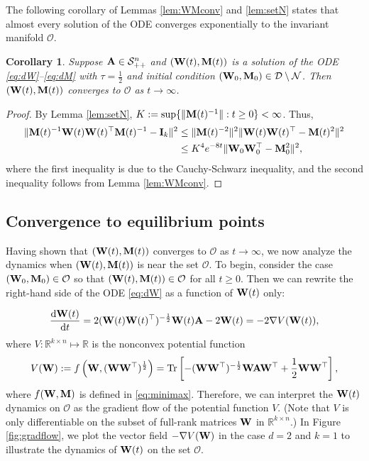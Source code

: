 \documentclass[11pt]{article}
\newtheorem{corollary}{Corollary}
\theoremstyle{definition}
\DeclareMathOperator{\tr}{Tr}
\newcommand{\dd}{\operatorname{d}\!}
\newcommand{\A}{{\bf A}}
\newcommand{\I}{{\bf I}}
\newcommand{\M}{{\bf M}}
\newcommand{\R}{\mathbb{R}}
\newcommand{\W}{{\bf W}}
\newcommand{\calD}{\mathcal{D}}
\newcommand{\calN}{\mathcal{N}}
\newcommand{\calO}{\mathcal{O}}
\newcommand{\calS}{\mathcal{S}}
\begin{document}
The following corollary of Lemmas \ref{lem:WMconv} and \ref{lem:setN} states that almost every solution of the ODE converges exponentially to the invariant manifold $\calO$.

\begin{corollary}\label{cor:MWinv}
    Suppose $\A\in\calS_{++}^n$ and $(\W(t),\M(t))$ is a solution of the ODE \eqref{eq:dW}--\eqref{eq:dM} with  $\tau=\frac12$ and initial condition $(\W_0,\M_0)\in\calD\setminus\calN$. 
    Then $(\W(t),\M(t))$ converges to $\calO$ as $t\to\infty$.
\end{corollary}

\begin{proof}
    By Lemma \ref{lem:setN}, $K:=\sup\{\|\M(t)^{-1}\|:t\ge0\}<\infty$. Thus,
    \begin{align*}
        \|\M(t)^{-1}\W(t)\W(t)^\top\M(t)^{-1}-\I_k\|^2&\le\|\M(t)^{-2}\|^2\|\W(t)\W(t)^\top-\M(t)^2\|^2\\
        &\le K^4e^{-8t}\|\W_0\W_0^\top-\M_0^2\|^2,
    \end{align*}
    where the first inequality is due to the Cauchy-Schwarz inequality, and the second inequality follows from Lemma \ref{lem:WMconv}. 
\end{proof}

\subsection{Convergence to equilibrium points}\label{sec:gradflow}

Having shown that $(\W(t),\M(t))$ converges to $\calO$ as $t\to\infty$, we now analyze the dynamics when $(\W(t),\M(t))$ is near the set $\calO$. To begin, consider the case $(\W_0,\M_0)\in\calO$ so that $(\W(t),\M(t))\in\calO$ for all $t\ge0$. Then we can rewrite the right-hand side of the ODE \eqref{eq:dW} as a function of $\W(t)$ only:

\begin{align}
\label{eq:dW1}
    \frac{\dd \W(t)}{\dd t}=2(\W(t)\W(t)^\top)^{-\frac12}\W(t)\A-2\W(t)=-2\nabla V(\W(t)),
\end{align}
where $V:\R^{k\times n}\mapsto\R$ is the nonconvex potential function
\begin{align}
\label{eq:V}
    V(\W):=f\left(\W,(\W\W^\top)^\frac12\right)=\tr\left[-(\W\W^\top)^{-\frac12}\W\A\W^\top+\frac12\W\W^\top\right],
\end{align}
where $f(\W,\M)$ is defined in \eqref{eq:minimax}.
Therefore, we can interpret the $\W(t)$ dynamics on $\calO$ as the gradient flow of the potential function $V$. (Note that $V$ is only differentiable on the subset of full-rank matrices $\W$ in $\R^{k\times n}$.) In Figure \ref{fig:gradflow}, we plot the vector field $-\nabla V(\W)$ in the case $d=2$ and $k=1$ to illustrate the dynamics of $\W(t)$ on the set $\calO$.
\end{document}
